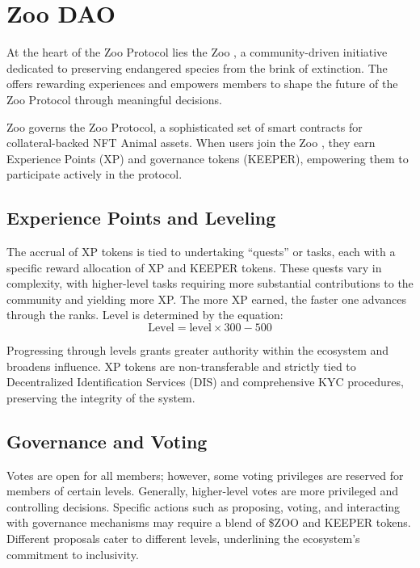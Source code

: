 \section{Zoo DAO}

At the heart of the Zoo Protocol lies the Zoo \DAO{}, a community-driven initiative dedicated to preserving endangered species from the brink of extinction. The \DAO{} offers rewarding experiences and empowers members to shape the future of the Zoo Protocol through meaningful decisions.

Zoo \DAO{} governs the Zoo Protocol, a sophisticated set of smart contracts for collateral-backed NFT Animal assets. When users join the Zoo \DAO{}, they earn Experience Points (XP) and governance tokens (KEEPER), empowering them to participate actively in the protocol.

\subsection{Experience Points and Leveling}

The accrual of XP tokens is tied to undertaking ``quests'' or tasks, each with a specific reward allocation of XP and KEEPER tokens. These quests vary in complexity, with higher-level tasks requiring more substantial contributions to the community and yielding more XP. The more XP earned, the faster one advances through the ranks. Level is determined by the equation:
\begin{equation}
\text{Level} = \text{level} \times 300 - 500
\end{equation}

Progressing through levels grants greater authority within the ecosystem and broadens influence. XP tokens are non-transferable and strictly tied to Decentralized Identification Services (DIS) and comprehensive KYC procedures, preserving the integrity of the system.

\subsection{Governance and Voting}

Votes are open for all members; however, some voting privileges are reserved for members of certain levels. Generally, higher-level votes are more privileged and controlling decisions. Specific actions such as proposing, voting, and interacting with governance mechanisms may require a blend of \$ZOO and KEEPER tokens. Different proposals cater to different levels, underlining the ecosystem's commitment to inclusivity.

